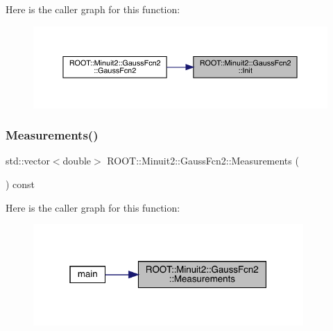 Here is the caller graph for this function\+:
\nopagebreak
\begin{figure}[H]
\begin{center}
\leavevmode
\includegraphics[width=350pt]{da/d5d/classROOT_1_1Minuit2_1_1GaussFcn2_a4094daab77c76f30bacb299c5c3dfba4_icgraph}
\end{center}
\end{figure}
\mbox{\label{classROOT_1_1Minuit2_1_1GaussFcn2_acd862030b2db540b0a7210e78c2f913f}} 
\subsubsection{\texorpdfstring{Measurements()}{Measurements()}\hspace{0.1cm}{\footnotesize\ttfamily [1/2]}}
{\footnotesize\ttfamily std\+::vector$<$double$>$ R\+O\+O\+T\+::\+Minuit2\+::\+Gauss\+Fcn2\+::\+Measurements (\begin{DoxyParamCaption}{ }\end{DoxyParamCaption}) const\hspace{0.3cm}{\ttfamily [inline]}}

Here is the caller graph for this function\+:
\nopagebreak
\begin{figure}[H]
\begin{center}
\leavevmode
\includegraphics[width=292pt]{da/d5d/classROOT_1_1Minuit2_1_1GaussFcn2_acd862030b2db540b0a7210e78c2f913f_icgraph}
\end{center}
\end{figure}
\mbox{\label{classROOT_1_1Minuit2_1_1GaussFcn2_acd862030b2db540b0a7210e78c2f913f}} 
